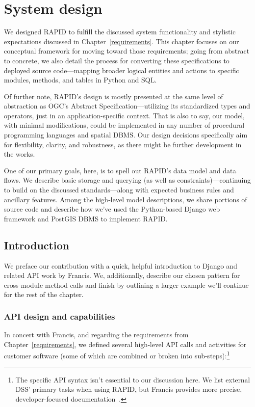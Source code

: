 \chapter{System design}
\label{design}

We designed RAPID to fulfill the discussed system functionality and stylistic expectations discussed in Chapter~\ref{requirements}. This chapter focuses on our conceptual framework for moving toward those requirements; going from abstract to concrete, we also detail the process for converting these specifications to deployed source code---mapping broader logical entities and actions to specific modules, methods, and tables in Python and SQL.

Of further note, RAPID's design is mostly presented at the same level of abstraction as OGC's Abstract Specification---utilizing its standardized types and operators, just in an application-specific context. That is also to say, our model, with minimal modifications, could be implemented in any number of procedural programming languages and spatial DBMS. Our design decisions specifically aim for flexibility, clarity, and robustness, as there might be further development in the works.

One of our primary goals, here, is to spell out RAPID's data model and data flows. We describe basic storage and querying (as well as constraints)---continuing to build on the discussed standards---along with expected business rules and ancillary features. Among the high-level model descriptions, we share portions of source code and describe how we've used the Python-based Django web framework and PostGIS DBMS to implement RAPID.


\section{Introduction}
We preface our contribution with a quick, helpful introduction to Django and related API work by Francis. We, additionally, describe our chosen pattern for cross-module method calls and finish by outlining a larger example we'll continue for the rest of the chapter.

\subsection{API design and capabilities}
In concert with Francis, and regarding the requirements from Chapter~\ref{requirements}, we defined several high-level API calls and activities for customer software (some of which are combined or broken into sub-steps):\footnote{The specific API syntax isn't essential to our discussion here. We list external DSS' primary tasks when using RAPID, but Francis provides more precise, developer-focused documentation~\cite{Francis}.}

